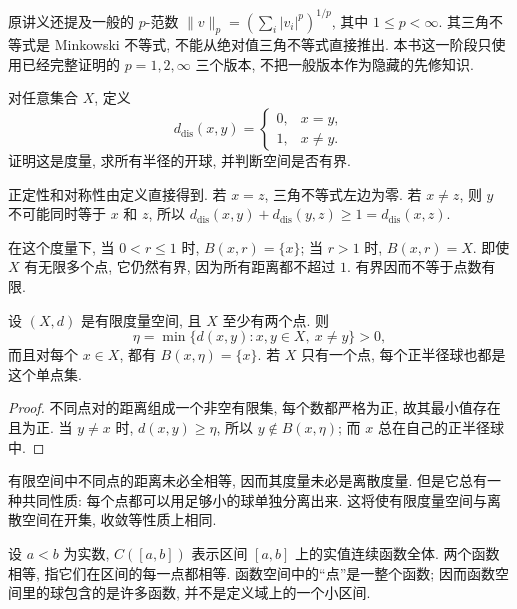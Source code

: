 \begin{remark}
原讲义还提及一般的 $p$-范数
$\lVert v\rVert_p=(\sum_i|v_i|^p)^{1/p}$, 其中 $1\le p<\infty$. 其三角不等式是 Minkowski 不等式, 不能从绝对值三角不等式直接推出. 本书这一阶段只使用已经完整证明的 $p=1,2,\infty$ 三个版本, 不把一般版本作为隐藏的先修知识.
\end{remark}

\label{ch:metric:discrete}
\begin{example}\label{ch:metric:discrete-example}
对任意集合 $X$, 定义
\[
 d_{\mathrm{dis}}(x,y)=
 \begin{cases}
 0,&x=y,\\
 1,&x\ne y.
 \end{cases}
\]
证明这是度量, 求所有半径的开球, 并判断空间是否有界.
\end{example}
\begin{solution}
正定性和对称性由定义直接得到. 若 $x=z$, 三角不等式左边为零. 若 $x\ne z$, 则 $y$ 不可能同时等于 $x$ 和 $z$, 所以 $d_{\mathrm{dis}}(x,y)+d_{\mathrm{dis}}(y,z)\ge1=d_{\mathrm{dis}}(x,z)$.

在这个度量下, 当 $0<r\le1$ 时, $B(x,r)=\{x\}$; 当 $r>1$ 时, $B(x,r)=X$. 即使 $X$ 有无限多个点, 它仍然有界, 因为所有距离都不超过 $1$. 有界因而不等于点数有限.
\end{solution}

\begin{proposition}[有限度量空间中的最小间隔]\label{ch:metric:finite}
设 $(X,d)$ 是有限度量空间, 且 $X$ 至少有两个点. 则
\[
 \eta=\min\{d(x,y):x,y\in X,\ x\ne y\}>0,
\]
而且对每个 $x\in X$, 都有 $B(x,\eta)=\{x\}$. 若 $X$ 只有一个点, 每个正半径球也都是这个单点集.
\end{proposition}
\begin{proof}
不同点对的距离组成一个非空有限集, 每个数都严格为正, 故其最小值存在且为正. 当 $y\ne x$ 时, $d(x,y)\ge\eta$, 所以 $y\notin B(x,\eta)$; 而 $x$ 总在自己的正半径球中.
\end{proof}
有限空间中不同点的距离未必全相等, 因而其度量未必是离散度量. 但是它总有一种共同性质: 每个点都可以用足够小的球单独分离出来. 这将使有限度量空间与离散空间在开集, 收敛等性质上相同.

\label{ch:metric:functions}
设 $a<b$ 为实数, $C([a,b])$ 表示区间 $[a,b]$ 上的实值连续函数全体. 两个函数相等, 指它们在区间的每一点都相等. 函数空间中的``点''是一整个函数; 因而函数空间里的球包含的是许多函数, 并不是定义域上的一个小区间.

